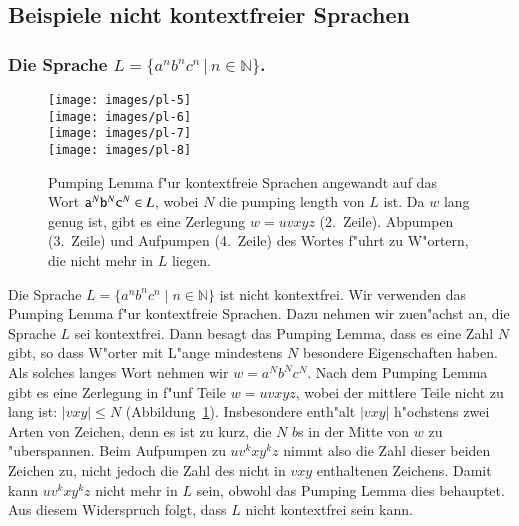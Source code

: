 \subsection{Beispiele nicht kontextfreier Sprachen}
\subsubsection{Die Sprache $L=\{a^nb^nc^n\,|\,n\in\mathbb N\}$.}
\begin{figure}
\begin{center}
\texttt{[image: images/pl-5]}\\%
\smallskip
\texttt{[image: images/pl-6]}\\%
\smallskip
\texttt{[image: images/pl-7]}\\%
\smallskip
\texttt{[image: images/pl-8]}%
\end{center}
\caption{Pumping Lemma f"ur kontextfreie Sprachen angewandt auf das 
Wort ${\tt a}^N{\tt b}^N{\tt c }^N\in L$, wobei $N$ die pumping length
von $L$ ist. Da $w$ lang genug ist, gibt es eine Zerlegung 
$w=uvxyz$ (2.~Zeile).
Abpumpen (3.~Zeile) und Aufpumpen (4.~Zeile) des
Wortes f"uhrt zu W"ortern, die nicht mehr in $L$ liegen.\label{pumpingcfgimage}}
\end{figure}

Die Sprache $L=\{a^nb^nc^n\;|\;n\in\mathbb N\}$ ist nicht kontextfrei.
Wir verwenden das Pumping Lemma f"ur kontextfreie Sprachen.  Dazu
nehmen wir zuen"achst an, die Sprache $L$ sei kontextfrei. Dann
besagt das Pumping Lemma, dass es eine Zahl $N$ gibt, so dass
W"orter mit L"ange mindestens $N$ besondere Eigenschaften haben.
Als solches langes Wort nehmen wir $w=a^Nb^Nc^N$. Nach dem
Pumping Lemma gibt es eine Zerlegung in f"unf Teile
$w=uvxyz$, wobei der mittlere Teile nicht zu lang ist:
$|vxy|\le N$ (Abbildung~\ref{pumpingcfgimage}).
Insbesondere enth"alt $|vxy|$ h"ochstens zwei
Arten von Zeichen, denn es ist zu kurz, die $N$ $b$s in der Mitte
von $w$ zu "uberspannen. Beim Aufpumpen zu $uv^kxy^kz$ nimmt also
die Zahl dieser beiden Zeichen zu, nicht jedoch die Zahl des nicht
in $vxy$ enthaltenen Zeichens.
Damit kann $uv^kxy^kz$ nicht mehr in $L$ sein, obwohl das
Pumping Lemma dies behauptet. Aus diesem Widerspruch folgt,
dass $L$ nicht kontextfrei sein kann.


